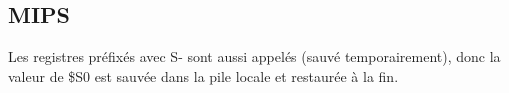 \subsection{MIPS}



Les registres préfixés avec S- sont aussi appelés   (sauvé temporairement),
donc la valeur de \$S0 est sauvée dans la pile locale et restaurée à la fin.
